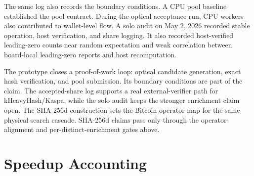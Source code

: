 \documentclass[11pt]{article}
\theoremstyle{definition}
\theoremstyle{remark}
\begin{document}
The same log also records the boundary conditions. A CPU pool baseline
established the pool contract. During the optical acceptance run, CPU workers
also contributed to wallet-level flow. A solo audit on May 2, 2026 recorded stable
operation, host verification, and share logging. It also recorded
host-verified leading-zero counts near random expectation and weak correlation
between board-local leading-zero reports and host recomputation.

The prototype closes a proof-of-work loop: optical candidate generation, exact
hash verification, and pool submission. Its boundary conditions are part of the
claim. The accepted-share log supports a real external-verifier path for
kHeavyHash/Kaspa, while the solo audit keeps the stronger enrichment claim open.
The SHA-256d construction sets the Bitcoin operator map for the same physical
search cascade. SHA-256d claims pass only through the operator-alignment and
per-distinct-enrichment gates above.

\section{Speedup Accounting}
\end{document}
